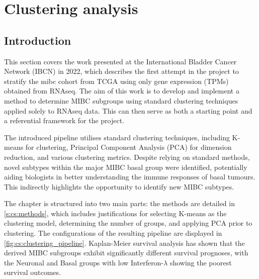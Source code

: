\chapter{Clustering analysis} \label{s:clustering_analysis}

\vspace{3mm}
\vspace{3mm}

\section{Introduction}

This section covers the work presented at the International Bladder Cancer Network (IBCN) in 2022, which describes the first attempt in the project to stratify the \acrfull{mibc} cohort from TCGA using only gene expression (TPMs) obtained from RNAseq. The aim of this work is to develop and implement a method to determine MIBC subgroups using standard clustering techniques applied solely to RNAseq data. This can then serve as both a starting point and a referential framework for the project.

The introduced pipeline utilises standard clustering techniques, including K-means for clustering, Principal Component Analysis (PCA) for dimension reduction, and various clustering metrics. Despite relying on standard methods, novel subtypes within the major MIBC basal group were identified, potentially aiding biologists in better understanding the immune responses of basal tumours. This indirectly highlights the opportunity to identify new MIBC subtypes.

The chapter is structured into two main parts: the methods are detailed in \cref{s:cs:methods}, which includes justifications for selecting K-means as the clustering model, determining the number of groups, and applying PCA prior to clustering. The configurations of the resulting pipeline are displayed in \cref{fig:cs:clustering_pipeline}. Kaplan-Meier survival analysis has shown that the derived MIBC subgroups exhibit significantly different survival prognoses, with the Neuronal and Basal groups with low Interferon-$\lambda$ showing the poorest survival outcomes.

